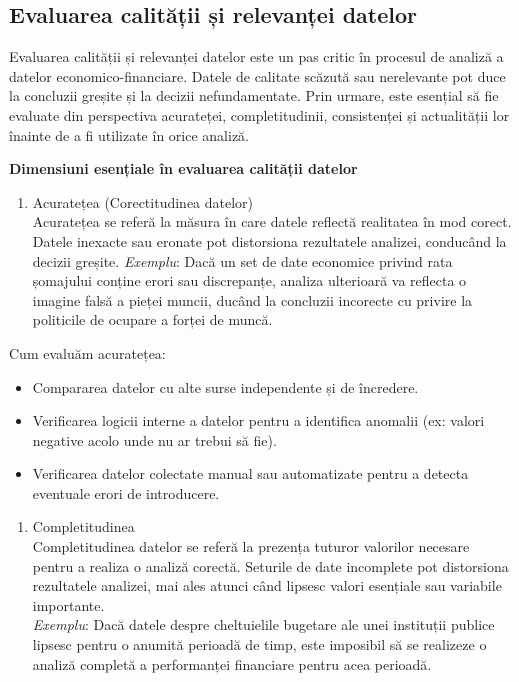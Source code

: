 \documentclass[
  11pt,
  b5paper,
  nottoc]{book}
\providecommand{\tightlist}{%
  \setlength{\itemsep}{0pt}\setlength{\parskip}{0pt}}\usepackage{longtable,booktabs,array}
\begin{document}
\subsection{Evaluarea calității și relevanței
datelor}\label{evaluarea-calitux103ux21bii-ux219i-relevanux21bei-datelor}

Evaluarea calității și relevanței datelor este un pas critic în procesul
de analiză a datelor economico-financiare. Datele de calitate scăzută
sau nerelevante pot duce la concluzii greșite și la decizii
nefundamentate. Prin urmare, este esențial să fie evaluate din
perspectiva acurateței, completitudinii, consistenței și actualității
lor înainte de a fi utilizate în orice analiză.

\textbf{Dimensiuni esențiale în evaluarea calității datelor}

\begin{enumerate}
\def\labelenumi{\arabic{enumi}.}
\tightlist
\item
  Acuratețea (Corectitudinea datelor)\\
  Acuratețea se referă la măsura în care datele reflectă realitatea în
  mod corect. Datele inexacte sau eronate pot distorsiona rezultatele
  analizei, conducând la decizii greșite. \emph{Exemplu}: Dacă un set de
  date economice privind rata șomajului conține erori sau discrepanțe,
  analiza ulterioară va reflecta o imagine falsă a pieței muncii, ducând
  la concluzii incorecte cu privire la politicile de ocupare a forței de
  muncă.
\end{enumerate}

Cum evaluăm acuratețea:

\begin{itemize}
\tightlist
\item
  Compararea datelor cu alte surse independente și de încredere.\\
\item
  Verificarea logicii interne a datelor pentru a identifica anomalii
  (ex: valori negative acolo unde nu ar trebui să fie).\\
\item
  Verificarea datelor colectate manual sau automatizate pentru a detecta
  eventuale erori de introducere.
\end{itemize}

\begin{enumerate}
\def\labelenumi{\arabic{enumi}.}
\setcounter{enumi}{1}
\tightlist
\item
  Completitudinea\\
  Completitudinea datelor se referă la prezența tuturor valorilor
  necesare pentru a realiza o analiză corectă. Seturile de date
  incomplete pot distorsiona rezultatele analizei, mai ales atunci când
  lipsesc valori esențiale sau variabile importante.\\
  \emph{Exemplu}: Dacă datele despre cheltuielile bugetare ale unei
  instituții publice lipsesc pentru o anumită perioadă de timp, este
  imposibil să se realizeze o analiză completă a performanței financiare
  pentru acea perioadă.
\end{enumerate}
\end{document}
